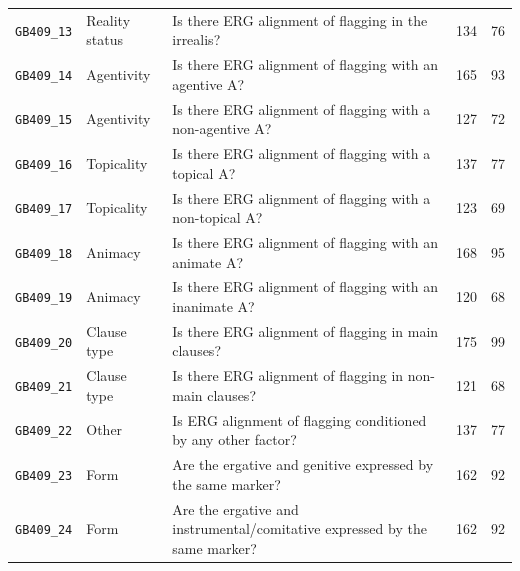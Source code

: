 \documentclass[12pt,a4paper]{article}
\newcommand{\feat}[1]{\texttt{#1}}
\begin{document}
\begin{longtable}{llp{6.5cm}rr}
\feat{GB409\_13} & Reality status      & Is there ERG alignment of flagging in the irrealis?                       & 134 & 76 \\
\feat{GB409\_14} & Agentivity  & Is there ERG alignment of flagging with an agentive A?                    & 165 & 93 \\
\feat{GB409\_15} & Agentivity  & Is there ERG alignment of flagging with a non-agentive A?                 & 127 & 72 \\
\feat{GB409\_16} & Topicality  & Is there ERG alignment of flagging with a topical A?                      & 137 & 77 \\
\feat{GB409\_17} & Topicality  & Is there ERG alignment of flagging with a non-topical A?                  & 123 & 69 \\
\feat{GB409\_18} & Animacy     & Is there ERG alignment of flagging with an animate A?                     & 168 & 95 \\
\feat{GB409\_19} & Animacy     & Is there ERG alignment of flagging with an inanimate A?                   & 120 & 68 \\
\feat{GB409\_20} & Clause type & Is there ERG alignment of flagging in main clauses?                       & 175 & 99 \\
\feat{GB409\_21} & Clause type & Is there ERG alignment of flagging in non-main clauses?                   & 121 & 68 \\
\feat{GB409\_22} & Other       & Is ERG alignment of flagging conditioned by any other factor?             & 137 & 77 \\
\feat{GB409\_23} & Form        & Are the ergative and genitive expressed by the same marker?               & 162 & 92 \\
\feat{GB409\_24} & Form        & Are the ergative and instrumental/comitative expressed by the same marker? & 162 & 92 \\
\end{longtable}

\bigskip
\end{document}
